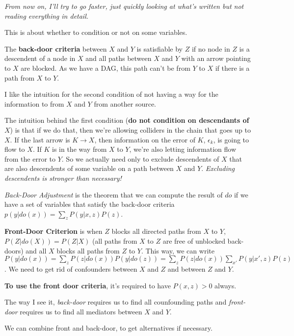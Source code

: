\textit{From now on, I'll try to go faster, just quickly looking at what's written but not reading everything in detail.}

This is about whether to condition or not on some variables.

The \textbf{back-door criteria} between $X$ and $Y$ is satisfiable by $Z$ if no node in $Z$ is a descendent of a node in $X$ and all paths between $X$ and $Y$ with an arrow pointing to $X$ are blocked. As we have a DAG, this path can't be from $Y$ to $X$ if there is a path from $X$ to $Y$.

I like the intuition for the second condition of not having a way for the information to  from $X$ and $Y$ from another source.

The intuition behind the first condition (\textbf{do not condition on descendants of $X$}) is that if we do that, then we're allowing colliders in the chain that goes up to $X$. If the last arrow is $K \rightarrow X$, then information on the error of $K$, $\epsilon_k$, is going to flow to $X$. If $K$ is in the way from $X$ to $Y$, we're also letting information flow from the error to $Y$. So we actually need only to exclude descendents of $X$ that are also descendents of some variable on a path between $X$ and $Y$. \textit{Excluding descendents is stronger than necessary!}

\textit{Back-Door Adjustment} is the theorem that we can compute the result of $do$ if we have a set of variables that satisfy the back-door criteria $p(y|do(x)) = \sum\limits_{z}P(y|x,z)P(z)$.

\textbf{Front-Door Criterion} is when $Z$ blocks all directed paths from $X$ to $Y$, $P(Z|do(X)) = P(Z|X)$ (all paths from $X$ to $Z$ are free of unblocked back-doors) and all $X$ blocks all paths from $Z$ to $Y$. This way, we can write $P(y|do(x)) = \sum\limits_z P(z|do(x)) P(y|do(z)) = \sum\limits_z P(z|do(x)) \sum\limits_{x'} P(y|x',z)P(z)$. We need to get rid of confounders between $X$ and $Z$ and between $Z$ and $Y$.

\textbf{To use the front door criteria}, it's required to have $P(x,z) > 0$ always.

The way I see it, \textit{back-door} requires us to find all counfounding paths and \textit{front-door} requires us to find all mediators between $X$ and $Y$.

We can combine front and back-door, to get alternatives if necessary.


